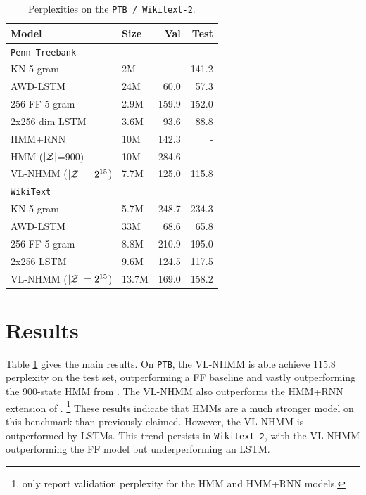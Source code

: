 \documentclass[11pt,a4paper]{article}
\begin{document}
\begin{table}[!t]
\centering
\begin{tabular}{llrr}
\toprule
Model & Size & Val  & Test \\
\midrule
\texttt{Penn Treebank}\\
\midrule
KN 5-gram   & 2M & - & 141.2\\
AWD-LSTM  & 24M & 60.0 & 57.3\\
256 FF 5-gram  & 2.9M     & 159.9      & 152.0  \\
2x256 dim LSTM  & 3.6M     & 93.6       & 88.8   \\
HMM+RNN   & 10M & 142.3 & -\\
HMM ($|\mathcal{Z}|$=900) & 10M & 284.6 & -\\
VL-NHMM ($|\mathcal{Z}|=2^{15}$)   & 7.7M     & 125.0      & 115.8  \\
\midrule
\texttt{WikiText}\\
\midrule
KN 5-gram & 5.7M       & 248.7 & 234.3\\
AWD-LSTM & 33M & 68.6 & 65.8\\
256 FF 5-gram        & 8.8M    & 210.9  & 195.0\\
2x256  LSTM     & 9.6M    & 124.5  & 117.5\\
VL-NHMM ($|\mathcal{Z}|=2^{15}$)           & 13.7M   & 169.0      & 158.2\\
\bottomrule
\end{tabular}
\caption{\label{tbl:ppl}
Perplexities on the \texttt{PTB / Wikitext-2}.
}
\end{table}


\section{Results}
Table \ref{tbl:ppl} gives the main results.
On \texttt{PTB}, the VL-NHMM is able achieve 115.8 perplexity on the test set,
outperforming a FF baseline
and vastly outperforming the 900-state HMM from \citet{buys2018hmm}.
The VL-NHMM also outperforms the HMM+RNN extension of \citet{buys2018hmm}.
\footnote{\citet{buys2018hmm} only report validation perplexity
for the HMM and HMM+RNN models.}
These results indicate that HMMs are a much stronger model
on this benchmark than previously claimed.
However, the VL-NHMM is outperformed by LSTMs.
This trend persists in \texttt{Wikitext-2},
with the VL-NHMM outperforming the FF model but underperforming an LSTM.
\end{document}
